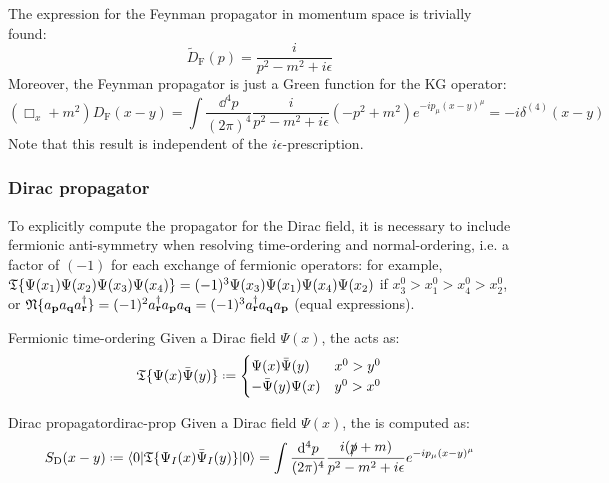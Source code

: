 The expression for the Feynman propagator in momentum space is trivially found:
\begin{equation}
  \tilde{D}_\text{F}(p) = \frac{i}{p^2 - m^2 + i\epsilon}
\end{equation}
Moreover, the Feynman propagator is just a Green function for the KG operator:
\begin{equation*}
  (\Box_x + m^2) D_\text{F}(x-y) = \int \frac{\dd^4p}{(2\pi)^4} \frac{i}{p^2 - m^2 + i\epsilon} (-p^2 + m^2) e^{-i p_\mu (x-y)^\mu} = -i \delta^{(4)}(x-y)
\end{equation*}
Note that this result is independent of the $ i\epsilon $-prescription.

\subsubsection{Dirac propagator}

To explicitly compute the propagator for the Dirac field, it is necessary to include fermionic anti-symmetry when resolving time-ordering and normal-ordering, i.e. a factor of $ (-1) $ for each exchange of fermionic operators: for example, $ \mathfrak{T}\{\Psi(x_1) \Psi(x_2) \Psi(x_3) \Psi(x_4)\} = (-1)^3 \Psi(x_3) \Psi(x_1) \Psi(x_4) \Psi(x_2) $ if $ x_3^0 > x_1^0 > x_4^0 > x_2^0 $, or $ \mathfrak{N}\{a_{\mathbf{p}} a_{\mathbf{q}} a_{\mathbf{r}}^\dagger\} = (-1)^2 a_{\mathbf{r}}^\dagger a_{\mathbf{p}} a_{\mathbf{q}} = (-1)^3 a_{\mathbf{r}}^\dagger a_{\mathbf{q}} a_{\mathbf{p}} $ (equal expressions).

\begin{definition}{Fermionic time-ordering}{}
  Given a Dirac field $ \Psi(x) $, the  acts as:
  \begin{equation}
    \tempord\{\Psi(x) \bar{\Psi}(y)\} \defeq
    \begin{cases}
      \Psi(x) \bar{\Psi}(y) & x^0 > y^0 \\
      -\bar{\Psi}(y) \Psi(x) & y^0 > x^0 \\
    \end{cases}
    \label{eq:ferm-tempord-ant}
  \end{equation}
\end{definition}

\begin{theorem}{Dirac propagator}{dirac-prop}
  Given a Dirac field $ \Psi(x) $, the  is computed as:
  \begin{equation}
    S_\text{D}(x - y) \defeq \braket{0 | \tempord\{\Psi_I(x) \bar{\Psi}_I(y)\} | 0} = \int \frac{\dd^4p}{(2\pi)^4} \frac{i (\slashed{p} + m)}{p^2 - m^2 + i\epsilon} e^{-i p_\mu (x - y)^\mu}
    \label{eq:dirac-prop}
  \end{equation}
\end{theorem}

